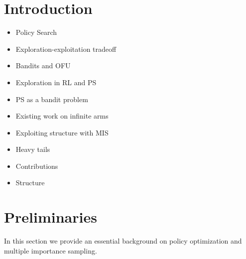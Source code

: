 \documentclass{article}
\begin{document}
\begin{abstract}
\lipsum[1]
\end{abstract}

\section{Introduction}
\begin{itemize}
	\item Policy Search
	\item Exploration-exploitation tradeoff
	\item Bandits and OFU
	\item Exploration in RL and PS
	\item PS as a bandit problem
	\item Existing work on infinite arms
	\item Exploiting structure with MIS
	\item Heavy tails
	\item Contributions
	\item Structure
\end{itemize}

\section{Preliminaries}
In this section we provide an essential background on policy optimization and multiple importance sampling.
\end{document}
